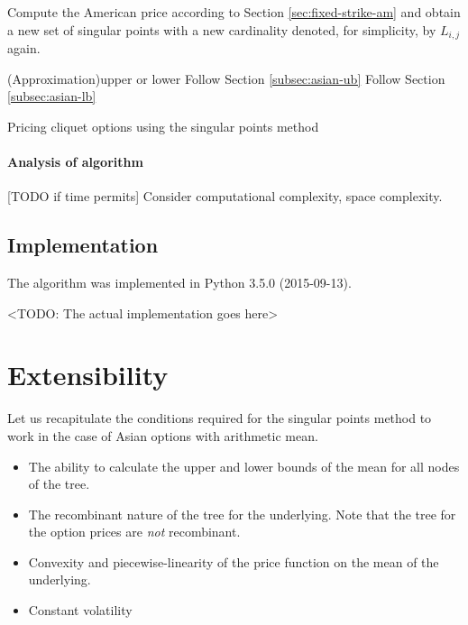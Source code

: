 \begin{algorithm}[H]
{{{				Compute the American price according to Section \ref{sec:fixed-strike-am} and obtain a new set of singular points with a new cardinality denoted, for simplicity, by $ L_{i,j} $ again. \;
				
				\Switch(Approximation){upper or lower}{
					 {Follow Section \ref{subsec:asian-ub} \;}
					 {Follow Section \ref{subsec:asian-lb} \;}
				}
			}
		}
	}
	
	\caption{Pricing cliquet options using the singular points method}
\end{algorithm}

\paragraph{Analysis of algorithm}
[TODO if time permits] Consider computational complexity, space complexity.


\subsection{Implementation}
The algorithm was implemented in Python 3.5.0 (2015-09-13).

<TODO: The actual implementation goes here>



\section{Extensibility}
\label{sec:asian-extensions}

Let us recapitulate the conditions required for the singular points method to work in the case of Asian options with arithmetic mean.
\begin{itemize}
	\item The ability to calculate the upper and lower bounds of the mean for all nodes of the tree.
	\item The recombinant nature of the tree for the underlying. Note that the tree for the option prices are \emph{not} recombinant.
	\item Convexity and piecewise-linearity of the price function on the mean of the underlying.
	\item Constant volatility
\end{itemize}

